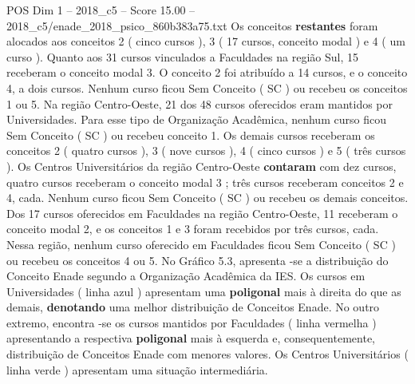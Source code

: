 \begin{textsample}{POS Dim 1 – 2018\_c5 – Score 15.00 – 2018\_c5/enade\_2018\_psico\_860b383a75.txt}
Os conceitos \textbf{restantes} foram alocados aos conceitos 2 ( cinco cursos ), 3 ( 17 cursos, conceito modal ) e 4 ( um curso ).
Quanto aos 31 cursos vinculados a Faculdades na região Sul, 15 receberam o conceito modal 3.
O conceito 2 foi atribuído a 14 cursos, e o conceito 4, a dois cursos.
Nenhum curso ficou Sem Conceito ( SC ) ou recebeu os conceitos 1 ou 5.
Na região Centro-Oeste, 21 dos 48 cursos oferecidos eram mantidos por Universidades.
Para esse tipo de Organização Acadêmica, nenhum curso ficou Sem Conceito ( SC ) ou recebeu conceito 1.
Os demais cursos receberam os conceitos 2 ( quatro cursos ), 3 ( nove cursos ), 4 ( cinco cursos ) e 5 ( três cursos ).
Os Centros Universitários da região Centro-Oeste \textbf{contaram} com dez cursos, quatro cursos receberam o conceito modal 3 ; três cursos receberam conceitos 2 e 4, cada.
Nenhum curso ficou Sem Conceito ( SC ) ou recebeu os demais conceitos.
Dos 17 cursos oferecidos em Faculdades na região Centro-Oeste, 11 receberam o conceito modal 2, e os conceitos 1 e 3 foram recebidos por três cursos, cada.
Nessa região, nenhum curso oferecido em Faculdades ficou Sem Conceito ( SC ) ou recebeu os conceitos 4 ou 5.
No Gráfico 5.3, apresenta -se a distribuição do Conceito Enade segundo a Organização Acadêmica da IES.
Os cursos em Universidades ( linha azul ) apresentam uma \textbf{poligonal} mais à direita do que as demais, \textbf{denotando} uma melhor distribuição de Conceitos Enade.
No outro extremo, encontra -se os cursos mantidos por Faculdades ( linha vermelha ) apresentando a respectiva \textbf{poligonal} mais à esquerda e, consequentemente, distribuição de Conceitos Enade com menores valores.
Os Centros Universitários ( linha verde ) apresentam uma situação intermediária.

\end{textsample}
